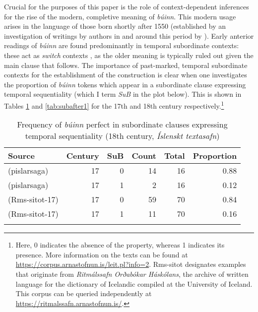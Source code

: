\documentclass[output=paper,colorlinks,citecolor=brown]{langscibook}
\begin{document}
Crucial for the purposes of this paper is the role of context-dependent inferences for the rise of the modern, completive meaning of \textit{búinn}. This modern usage arises in the language of those born shortly after 1550 (established by an investigation of writings by authors in and around this period by \cite{arnason1977buinn}). Early anterior readings of \textit{búinn} are found predominantly in temporal subordinate contexts: these act as \textit{switch} contexts \citep{heine2002role}, as the older meaning is typically ruled out given the main clause that follows. The importance of past-marked, temporal subordinate contexts for the establishment of the construction is clear when one investigates the proportion of \textit{búinn} tokens which appear in a subordinate clause expressing temporal sequentiality (which I term \textit{SuB} in the plot below). This is shown in Tables \ref{tab:subafter2} and \ref{tab:subafter1} for the 17th and 18th century respectively.\footnote{Here, 0 indicates the absence of the property, whereas 1 indicates its presence. More information on the texts can be found at \url{https://corpus.arnastofnun.is/leit.pl?info=2}. Rms-sitot designates examples that originate from \textit{Ritmálssafn Orðabókar Háskólans}, the archive of written language for the dictionary of Icelandic compiled at the University of Iceland. This corpus can be queried independently at \url{https://ritmalssafn.arnastofnun.is/}.}

\begin{table}
\small
\begin{tabularx}{.8\textwidth}{Xrrrrr}
\lsptoprule
Source & Century & SuB & Count & Total & Proportion \\ 
\midrule
(pislarsaga) & 17 & 0 & 14 & 16 & 0.88 \\ 
(pislarsaga) & 17 & 1 & 2 & 16 & 0.12 \\ 
(Rms-sitot-17) & 17 & 0 & 59 & 70 & 0.84 \\ 
(Rms-sitot-17) & 17 & 1 & 11 & 70 & 0.16 \\ 
\lspbottomrule
\end{tabularx}
\caption{Frequency of \textit{búinn} perfect in subordinate clauses expressing temporal sequentiality (18th century, \textit{Íslenskt textasafn})}
\label{tab:subafter2}
\end{table}
\end{document}
